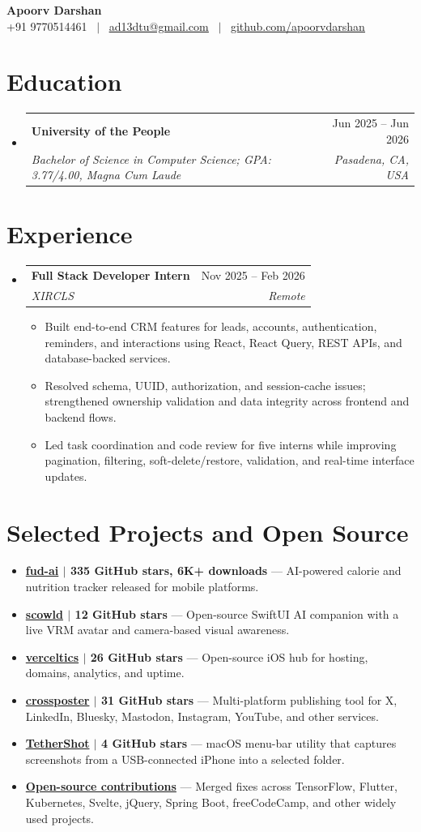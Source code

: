 \documentclass[letterpaper,10pt]{article}
\makeatletter
\newcommand{\resumeSubHeadingListStart}{\begin{itemize}[leftmargin=0in,label={}]}
\newcommand{\resumeSubHeadingListEnd}{\end{itemize}}
\newcommand{\resumeItemListStart}{\begin{itemize}[leftmargin=0.18in,nosep,itemsep=1pt,topsep=2pt]}
\newcommand{\resumeItemListEnd}{\end{itemize}\vspace{-3pt}}
\newcommand{\resumeItem}[1]{\item\small #1}
\newcommand{\resumeSubheading}[4]{
  \item
  \begin{tabular*}{\textwidth}[t]{l@{\extracolsep{\fill}}r}
    \textbf{#1} & #2 \\
    \textit{\small #3} & \textit{\small #4} \\
  \end{tabular*}\vspace{-7pt}
}
\newcommand{\resumeProject}[2]{
  \item\small
  \textbf{#1} --- #2\vspace{-1pt}
}
\makeatother
\begin{document}
\begin{center}
  {\Huge\textbf{Apoorv Darshan}}\\[4pt]
  \small
  +91 9770514461 \ $|$ \
  \href{mailto:ad13dtu@gmail.com}{\underline{ad13dtu@gmail.com}} \ $|$ \
  \href{https://github.com/apoorvdarshan}{\underline{github.com/apoorvdarshan}}
\end{center}

\section{Education}
\resumeSubHeadingListStart
  \resumeSubheading
    {University of the People}{Jun 2025 -- Jun 2026}
    {Bachelor of Science in Computer Science; GPA: 3.77/4.00, Magna Cum Laude}{Pasadena, CA, USA}
\resumeSubHeadingListEnd

\section{Experience}
\resumeSubHeadingListStart
  \resumeSubheading
    {Full Stack Developer Intern}{Nov 2025 -- Feb 2026}
    {XIRCLS}{Remote}
  \resumeItemListStart
    \resumeItem{Built end-to-end CRM features for leads, accounts, authentication, reminders, and interactions using React, React Query, REST APIs, and database-backed services.}
    \resumeItem{Resolved schema, UUID, authorization, and session-cache issues; strengthened ownership validation and data integrity across frontend and backend flows.}
    \resumeItem{Led task coordination and code review for five interns while improving pagination, filtering, soft-delete/restore, validation, and real-time interface updates.}
  \resumeItemListEnd
\resumeSubHeadingListEnd

\section{Selected Projects and Open Source}
\resumeSubHeadingListStart
  \resumeProject{\href{https://github.com/apoorvdarshan/fud-ai}{fud-ai} $|$ 335 GitHub stars, 6K+ downloads}{AI-powered calorie and nutrition tracker released for mobile platforms.}
  \resumeProject{\href{https://github.com/apoorvdarshan/scowld}{scowld} $|$ 12 GitHub stars}{Open-source SwiftUI AI companion with a live VRM avatar and camera-based visual awareness.}
  \resumeProject{\href{https://github.com/apoorvdarshan/verceltics}{verceltics} $|$ 26 GitHub stars}{Open-source iOS hub for hosting, domains, analytics, and uptime.}
  \resumeProject{\href{https://github.com/apoorvdarshan/crossposter}{crossposter} $|$ 31 GitHub stars}{Multi-platform publishing tool for X, LinkedIn, Bluesky, Mastodon, Instagram, YouTube, and other services.}
  \resumeProject{\href{https://github.com/apoorvdarshan/TetherShot}{TetherShot} $|$ 4 GitHub stars}{macOS menu-bar utility that captures screenshots from a USB-connected iPhone into a selected folder.}
  \resumeProject{\href{https://github.com/pulls?q=is\%3Apr+author\%3Aapoorvdarshan+is\%3Amerged}{Open-source contributions}}{Merged fixes across TensorFlow, Flutter, Kubernetes, Svelte, jQuery, Spring Boot, freeCodeCamp, and other widely used projects.}
\resumeSubHeadingListEnd
\end{document}
